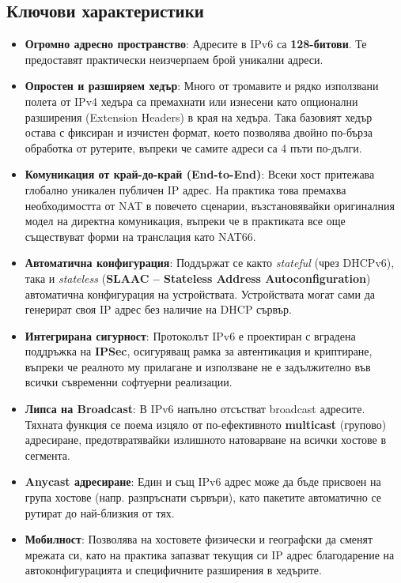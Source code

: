 \documentclass{scrartcl}
\begin{document}
\begin{FlushLeft}
\subsection{Ключови характеристики}
\begin{itemize}
    \item \textbf{Огромно адресно пространство}: Адресите в IPv6 са \textbf{128-битови}. Те предоставят практически неизчерпаем брой уникални адреси.
    \item \textbf{Опростен и разширяем хедър}: Много от тромавите и рядко използвани полета от IPv4 хедъра са премахнати или изнесени като опционални разширения (Extension Headers) в края на хедъра. Така базовият хедър остава с фиксиран и изчистен формат, което позволява двойно по-бърза обработка от рутерите, въпреки че самите адреси са 4 пъти по-дълги.
    \item \textbf{Комуникация от край-до-край (End-to-End)}: Всеки хост притежава глобално уникален публичен IP адрес. На практика това премахва необходимостта от NAT в повечето сценарии, възстановявайки оригиналния модел на директна комуникация, въпреки че в практиката все още съществуват форми на транслация като NAT66.
    \item \textbf{Автоматична конфигурация}: Поддържат се както \textit{stateful} (чрез DHCPv6), така и \textit{stateless} (\textbf{SLAAC – Stateless Address Autoconfiguration}) автоматична конфигурация на устройствата. Устройствата могат сами да генерират своя IP адрес без наличие на DHCP сървър.
    \item \textbf{Интегрирана сигурност}: Протоколът IPv6 е проектиран с вградена поддръжка на \textbf{IPSec}, осигуряващ рамка за автентикация и криптиране, въпреки че реалното му прилагане и използване не е задължително във всички съвременни софтуерни реализации.
    \item \textbf{Липса на Broadcast}: В IPv6 напълно отсъстват broadcast адресите. Тяхната функция се поема изцяло от по-ефективното \textbf{multicast} (групово) адресиране, предотвратявайки излишното натоварване на всички хостове в сегмента.
    \item \textbf{Anycast адресиране}: Един и същ IPv6 адрес може да бъде присвоен на група хостове (напр. разпръснати сървъри), като пакетите автоматично се рутират до най-близкия от тях.
    \item \textbf{Мобилност}: Позволява на хостовете физически и географски да сменят мрежата си, като на практика запазват текущия си IP адрес благодарение на автоконфигурацията и специфичните разширения в хедърите.
\end{itemize}


\end{FlushLeft}
\end{document}
